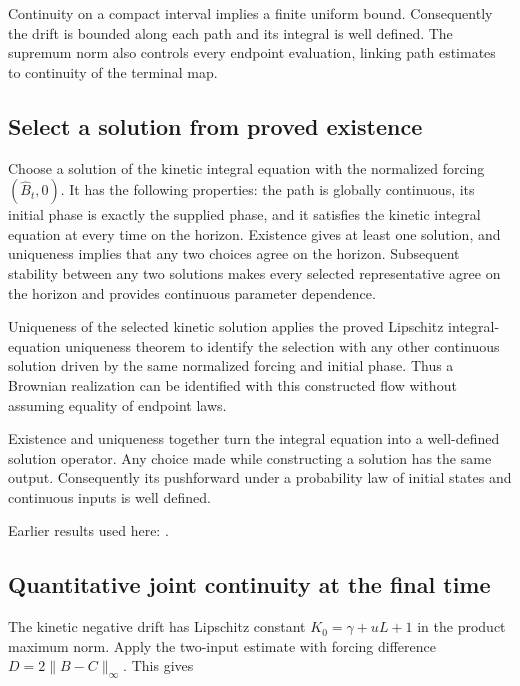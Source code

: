 \documentclass[11pt,a4paper]{report}
\begin{document}
Continuity on a compact interval implies a finite uniform bound. Consequently the drift is bounded along each path and its integral is well defined. The supremum norm also controls every endpoint evaluation, linking path estimates to continuity of the terminal map.

\subsection{\texorpdfstring{Select a solution from proved existence}{Select a solution from proved existence}}
\label{report-step-KineticLangevin-Flow-lean-3}


Choose a solution of the kinetic integral equation with the normalized forcing \((\widehat B_t,0)\). It has the following properties: the path is globally continuous, its initial phase is exactly the supplied phase, and it satisfies the kinetic integral equation at every time on the horizon. Existence gives at least one solution, and uniqueness implies that any two choices agree on the horizon. Subsequent stability between any two solutions makes every selected representative agree on the horizon and provides continuous parameter dependence.



Uniqueness of the selected kinetic solution applies the proved Lipschitz integral-equation uniqueness theorem to identify the selection with any other continuous solution driven by the same normalized forcing and initial phase. Thus a Brownian realization can be identified with this constructed flow without assuming equality of endpoint laws.



Existence and uniqueness together turn the integral equation into a well-defined solution operator. Any choice made while constructing a solution has the same output. Consequently its pushforward under a probability law of initial states and continuous inputs is well defined.



Earlier results used here: \cite[Section~3.43.2]{LangevinLean2026ULASC}.
\subsection{\texorpdfstring{Quantitative joint continuity at the final time}{Quantitative joint continuity at the final time}}
\label{report-step-KineticLangevin-Flow-lean-4}


The kinetic negative drift has Lipschitz constant \(K_0=\gamma+uL+1\) in the product maximum norm. Apply the two-input estimate with forcing difference \(D=2\|B-C\|_\infty\). This gives
\end{document}
